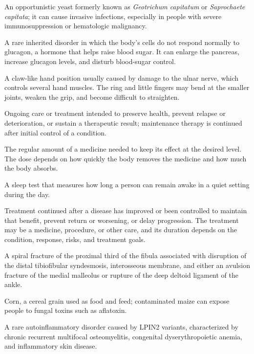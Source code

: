  An opportunistic yeast formerly known as \textit{Geotrichum capitatum} or \textit{Saprochaete capitata}; it can cause invasive infections, especially in people with severe immunosuppression or hematologic malignancy.

 A rare inherited disorder in which the body’s cells do not respond normally to glucagon, a hormone that helps raise blood sugar. It can enlarge the pancreas, increase glucagon levels, and disturb blood-sugar control.

 A claw-like hand position usually caused by damage to the ulnar nerve, which controls several hand muscles. The ring and little fingers may bend at the smaller joints, weaken the grip, and become difficult to straighten.

 Ongoing care or treatment intended to preserve health, prevent relapse or deterioration, or sustain a therapeutic result; maintenance therapy is continued after initial control of a condition.

 The regular amount of a medicine needed to keep its effect at the desired level. The dose depends on how quickly the body removes the medicine and how much the body absorbs.

 A sleep test that measures how long a person can remain awake in a quiet setting during the day.

 Treatment continued after a disease has improved or been controlled to maintain that benefit, prevent return or worsening, or delay progression. The treatment may be a medicine, procedure, or other care, and its duration depends on the condition, response, risks, and treatment goals.

 A spiral fracture of the proximal third of the fibula associated with disruption of the distal tibiofibular syndesmosis, interosseous membrane, and either an avulsion fracture of the medial malleolus or rupture of the deep deltoid ligament of the ankle.

 Corn, a cereal grain used as food and feed; contaminated maize can expose people to fungal toxins such as aflatoxin.

 A rare autoinflammatory disorder caused by LPIN2 variants, characterized by chronic recurrent multifocal osteomyelitis, congenital dyserythropoietic anemia, and inflammatory skin disease.

